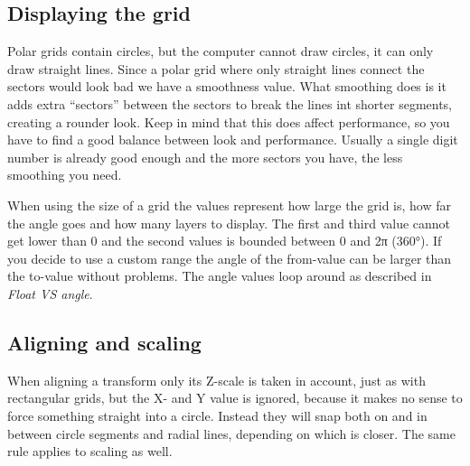 \subsection*{Displaying the grid }

Polar grids contain circles, but the computer cannot draw circles, it can only draw straight lines. Since a polar grid where only straight lines connect the sectors would look bad we have a {\ttfamily smoothness} value. What smoothing does is it adds extra “sectors” between the sectors to break the lines int shorter segments, creating a rounder look. Keep in mind that this does affect performance, so you have to find a good balance between look and performance. Usually a single digit number is already good enough and the more sectors you have, the less smoothing you need.



When using the {\ttfamily size} of a grid the values represent how large the grid is, how far the angle goes and how many layers to display. The first and third value cannot get lower than 0 and the second values is bounded between 0 and 2π (360°). If you decide to use a custom range the angle of the from-\/value can be larger than the to-\/value without problems. The angle values loop around as described in {\itshape Float V\+S angle}.

\subsection*{Aligning and scaling }

When aligning a transform only its Z-\/scale is taken in account, just as with rectangular grids, but the X-\/ and Y value is ignored, because it makes no sense to force something straight into a circle. Instead they will snap both on and in between circle segments and radial lines, depending on which is closer. The same rule applies to scaling as well. 